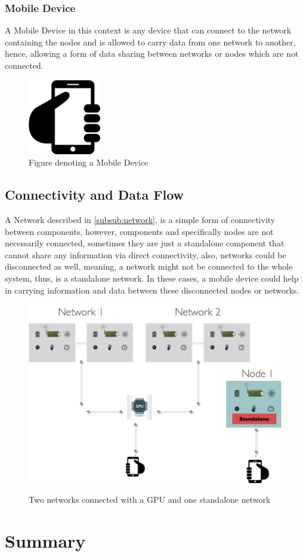 \subsubsection{Mobile Device}
A Mobile Device in this context is any device that can connect to the network containing the nodes and is allowed to  carry data from one network to another, hence, allowing a form of data sharing between networks or nodes which are not connected.

\begin{figure}[H]
	\centering
	\includegraphics[scale=0.3]{images/mobile.png}
	\caption{Figure denoting a Mobile Device}
	\label{fig:mobile}
\end{figure}



\subsection{Connectivity and Data Flow}
A Network described in \ref{subsub:network}, is a simple form of connectivity between components, however, components and specifically nodes are not necessarily connected, sometimes they are just a standalone component that cannot share any information via direct connectivity, also, networks could be disconnected as well, meaning, a network might not be connected to the whole system, thus, is a standalone network. In these cases, a mobile device could help in carrying information and data between these disconnected nodes or networks. 

\begin{figure}[H]
	\centering
	\includegraphics[scale=0.5]{images/system.png}
	\label{fig:system}
	\caption{Two networks connected with a GPU and one standalone network}
\end{figure}









\section{Summary}



